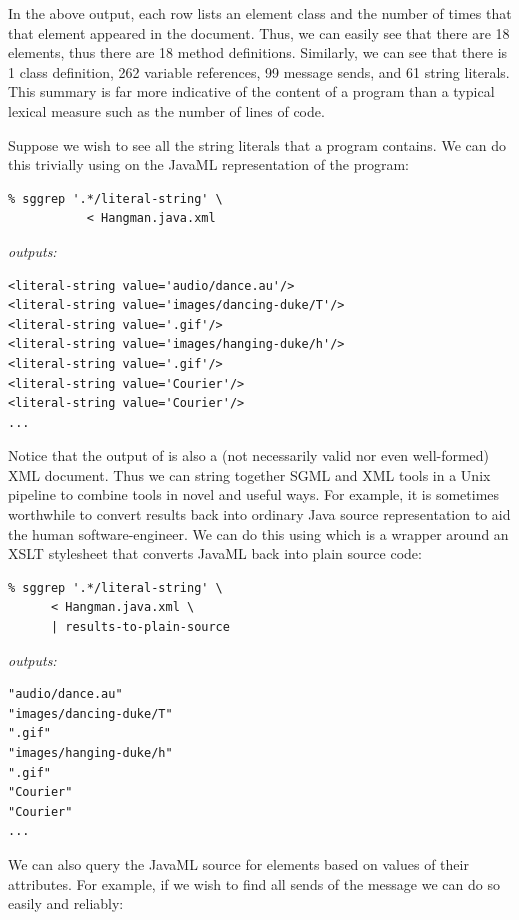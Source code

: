 \documentclass{article}
\begin{document}
\begin{multicols}{2}
In the above output, each row lists an element class and the number of
times that that element appeared in the document.  Thus, we can easily
see that there are 18  elements, thus there are 18
method definitions.  Similarly, we can see that there is 1 class
definition, 262 variable references, 99 message sends, and 61 string
literals.  This summary is far more indicative of the content of a
program than a typical lexical measure such as the number of lines of
code.

Suppose we wish to see all the string literals that a program contains.
We can do this trivially using  on the JavaML
representation of the program:

\begin{verbatim}
% sggrep '.*/literal-string' \
           < Hangman.java.xml
\end{verbatim}

\noindent\emph{outputs:}
{\small
\begin{verbatim}
<literal-string value='audio/dance.au'/>
<literal-string value='images/dancing-duke/T'/>
<literal-string value='.gif'/>
<literal-string value='images/hanging-duke/h'/>
<literal-string value='.gif'/>
<literal-string value='Courier'/>
<literal-string value='Courier'/>
...
\end{verbatim}
}

\noindent Notice that the output of  is also a (not necessarily
valid nor even well-formed) XML document.  Thus we can string together
SGML and XML tools in a Unix pipeline to combine tools in novel and
useful ways.  For example, it is sometimes worthwhile to convert results back into
ordinary Java source representation to aid the human software-engineer.
We can do this using  which is a
wrapper around an XSLT stylesheet that converts JavaML back into
plain source code:

\begin{verbatim}
% sggrep '.*/literal-string' \
      < Hangman.java.xml \
      | results-to-plain-source
\end{verbatim}

\noindent\emph{outputs:}
\begin{verbatim}
"audio/dance.au"
"images/dancing-duke/T"
".gif"
"images/hanging-duke/h"
".gif"
"Courier"
"Courier"
...
\end{verbatim}

We can also query the JavaML source for elements based on values of
their attributes.  For example, if we wish to find all sends of the
message \smtexttt{setFont} we can do so easily and reliably:


\end{multicols}
\end{document}
